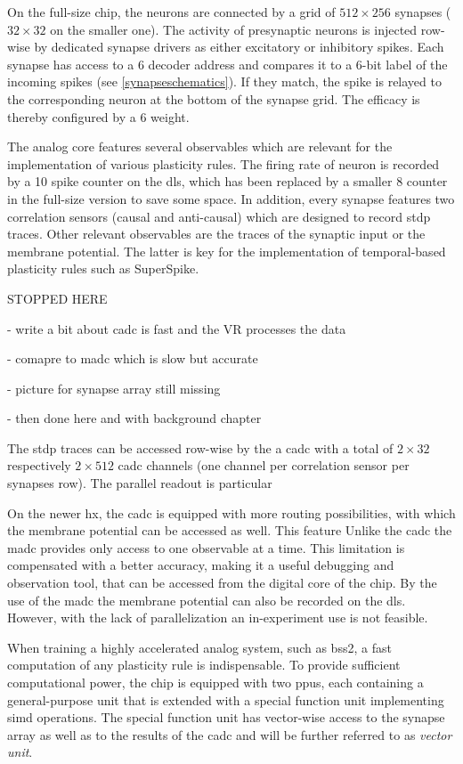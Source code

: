 On the full-size chip, the neurons are connected by a grid of $512 \times 256$ synapses ($32 \times 32$ on the smaller one). The activity of presynaptic neurons is injected row-wise by dedicated synapse drivers as either excitatory or inhibitory spikes. Each synapse has access to a \SI{6}{\bit} decoder address and compares it to a 6-bit label of the incoming spikes (see \cref{synapseschematics}). If they match, the spike is relayed to the corresponding neuron at the bottom of the synapse grid. The efficacy is thereby configured by a \SI{6}{\bit} weight.

The analog core features several observables which are relevant for the implementation of various plasticity rules. The firing rate of neuron is recorded by a \SI{10}{\bit} spike counter on the \gls{dls}, which has been replaced by a smaller \SI{8}{\bit} counter in the full-size version to save some space. In addition, every synapse features two correlation sensors (causal and anti-causal) which are designed to record \gls{stdp} traces. Other relevant observables are the traces of the synaptic input or the membrane potential. The latter is key for the implementation of temporal-based plasticity rules such as SuperSpike.


STOPPED HERE

- write a bit about cadc is fast and the VR processes the data

- comapre to madc which is slow but accurate

- picture for synapse array still missing

- then done here and with background chapter

The \gls{stdp} traces can be accessed row-wise by the a \gls{cadc} with a total of $2\times32$ respectively $2\times512$ \gls{cadc} channels (one channel per correlation sensor per synapses row). The parallel readout is particular


 On the newer \gls{hx}, the \gls{cadc} is equipped with more routing possibilities, with which the membrane potential can be accessed as well. This feature  Unlike the \gls{cadc} the \gls{madc} provides only access to one observable at a time. This limitation is compensated with a better accuracy, making it a useful debugging and observation tool, that can be accessed from the digital core of the chip. By the use of the \gls{madc} the membrane potential can also be recorded on the \gls{dls}. However, with the lack of parallelization an in-experiment use is not feasible.


When training a highly accelerated analog system, such as \gls{bss2}, a fast computation of any plasticity rule is indispensable. To provide sufficient computational power, the chip is equipped with two \glspl{ppu}, each containing a general-purpose unit that is extended with a special function unit implementing \gls{simd} operations. The special function unit has vector-wise access to the synapse array as well as to the results of the \gls{cadc} and will be further referred to as \emph{vector unit}.

